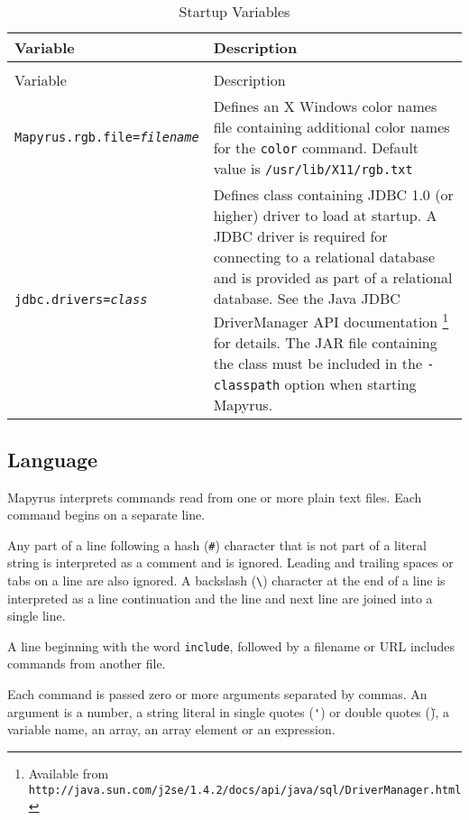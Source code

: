 \begin{longtable}{|l|p{7cm}|}
\hline
\label{startupvariables}
Variable & Description \\
\hline
\hline
\endfirsthead
\hline
\caption{Startup Variables} \\
\endfoot

\hline
Variable & Description \\
\hline
\hline
\endhead

\texttt{Mapyrus.rgb.file=\textit{filename}} &
Defines an X Windows color names file containing additional color names
for the
\texttt{color} command.  Default value is
\texttt{/usr/lib/X11/rgb.txt} \\

\hline

\texttt{jdbc.drivers=\textit{class}} &
Defines class containing JDBC 1.0 (or higher) driver to load at startup.
A JDBC driver is required for connecting to a relational database and
is provided as part of a relational database.
See the Java JDBC DriverManager API documentation
\footnote{Available from
\texttt{http://java.sun.com/j2se/1.4.2/docs/api/java/sql/DriverManager.html}}
for details.
The JAR file containing the class must be included in the \texttt{-classpath}
option when starting Mapyrus. \\

\hline
\end{longtable}

\subsection{Language}

Mapyrus interprets commands read from one or more plain text files.
Each command begins on a separate line.

Any part of a line following a hash (\texttt{\#}) character that is not part of
a literal string is interpreted as a comment and is ignored.  Leading and
trailing spaces or tabs on a line are also ignored.  A backslash
(\texttt{\textbackslash}) character at the end of a line is interpreted as a
line continuation and the line and next line are joined into a single line.

A line beginning with the word \texttt{include}, followed by a filename
or URL includes commands from another file.

Each command is passed zero or more arguments separated by commas.
An argument is a number, a string literal in single quotes (\texttt{\'})
or double quotes (\texttt{\"}), a variable name, an array, an
array element or an expression.


